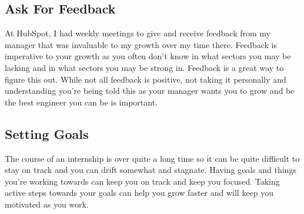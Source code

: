 \subsection{Ask For Feedback}
At HubSpot, I had weekly meetings to give and receive feedback from my manager that was invaluable to my growth over my time there. Feedback is imperative to your growth as you often don't know in what sectors you may be lacking and in what sectors you may be strong in. Feedback is a great way to figure this out. While not all feedback is positive, not taking it personally and understanding you're being told this as your manager wants you to grow and be the best engineer you can be is important.

\subsection{Setting Goals}
The course of an internship is over quite a long time so it can be quite difficult to stay on track and you can drift somewhat and stagnate. Having goals and things you're working towards can keep you on track and keep you focused. Taking active steps towards your goals can help you grow faster and will keep you motivated as you work.